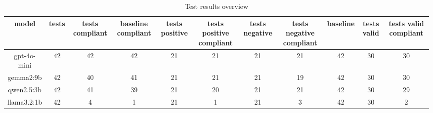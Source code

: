 
  \begin{table}[h!]
  \centering
  \begin{tabular}{|c|c|c|c|c|c|c|c|c|c|c|}
  \hline
  model & tests & tests compliant & baseline compliant & tests positive & tests positive compliant & tests negative & tests negative compliant & baseline & tests valid & tests valid compliant \\
  \hline
  gpt-4o-mini & 42 & 42 & 42 & 21 & 21 & 21 & 21 & 42 & 30 & 30\\
\hline
gemma2:9b & 42 & 40 & 41 & 21 & 21 & 21 & 19 & 42 & 30 & 30\\
\hline
qwen2.5:3b & 42 & 41 & 39 & 21 & 20 & 21 & 21 & 42 & 30 & 29\\
\hline
llama3.2:1b & 42 & 4 & 1 & 21 & 1 & 21 & 3 & 42 & 30 & 2
  \end{tabular}
  \caption{Test results overview}
  
  \end{table}
  